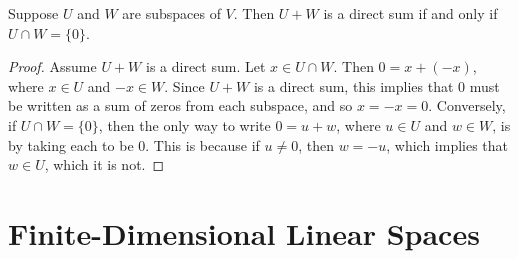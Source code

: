 \documentclass{article}
\begin{document}
  \begin{prop}
    Suppose $U$ and $W$ are subspaces of $V$. Then $U + W$ is a direct sum if and only if $U \cap W = \{0\}$.
  \end{prop}
  \begin{proof}
    Assume $U + W$ is a direct sum. Let $x \in U \cap W$. Then $0 = x + (-x)$, where $x \in U$ and $-x \in W$. Since $U + W$ is a direct sum, this implies that $0$ must be
    written as a sum of zeros from each subspace, and so $x = -x = 0$. Conversely, if $U \cap W = \{0\}$, then the only way to write $0 = u + w$, where $u \in U$ and $w \in
    W$, is by taking each to be $0$. This is because if $u \neq 0$, then $w = -u$, which implies that $w \in U$, which it is not.
  \end{proof}
\section{Finite-Dimensional Linear Spaces}
\end{document}
